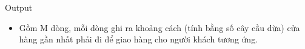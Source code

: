 Output
\begin{itemize}
	\item     Gồm M dòng, mỗi dòng ghi ra khoảng cách (tính bằng số cây cầu dừa) cửa hàng gần nhất phải đi để giao hàng cho người khách tương ứng.   
\end{itemize}